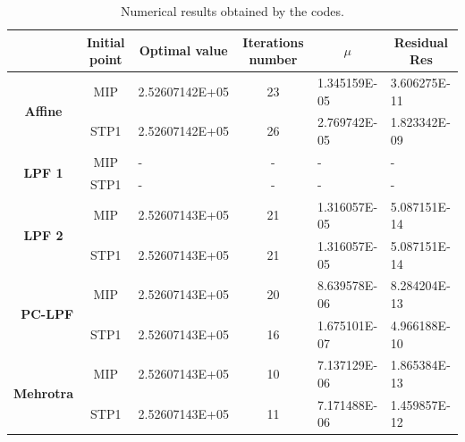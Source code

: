 \documentclass[a4paper,10 pt,titlepage,twoside]{book}
\theoremstyle{plain}
\theoremstyle{definition}
\theoremstyle{remark}
\begin{document}
\begin{table}[]\caption{\label{table:TP}Numerical results obtained by the codes.}
	\begin{tabular}{cclcll}
		\hline		\textbf{} & \textbf{Initial point} & \multicolumn{1}{c}{\textbf{Optimal value}} & \textbf{Iterations number} & \multicolumn{1}{c}{\textbf{$\mu$}} & \multicolumn{1}{c}{\textbf{Residual} Res} \\ \hline
		\multicolumn{1}{c|}{\multirow{2}{*}{\textbf{Affine}}} & MIP & 2.52607142E+05 & 23 & 1.345159E-05 & 3.606275E-11 \\
		\multicolumn{1}{c|}{} & STP1 & 2.52607142E+05 & 26 & 2.769742E-05 & 1.823342E-09 \\ \hline
		\multicolumn{1}{c|}{\multirow{2}{*}{\textbf{LPF 1}}} & MIP & - & - & - & - \\
		\multicolumn{1}{c|}{} & STP1 & - & - & - & - \\ \hline
		\multicolumn{1}{c|}{\multirow{2}{*}{\textbf{LPF 2}}} & MIP & 2.52607143E+05 & 21 & 1.316057E-05 & 5.087151E-14 \\
		\multicolumn{1}{c|}{} & STP1 & 2.52607143E+05 & 21 & 1.316057E-05 & 5.087151E-14 \\ \hline
		\multicolumn{1}{r|}{\multirow{2}{*}{\textbf{PC-LPF}}} & MIP & 2.52607143E+05 & 20 & 8.639578E-06 & 8.284204E-13 \\
		\multicolumn{1}{r|}{} & STP1 & 2.52607143E+05 & 16 & 1.675101E-07 & 4.966188E-10 \\ \hline
		\multicolumn{1}{c|}{\multirow{2}{*}{\textbf{Mehrotra}}} & MIP & 2.52607143E+05 & 10 & 7.137129E-06 & 1.865384E-13 \\
		\multicolumn{1}{c|}{} & STP1 & 2.52607143E+05 & 11 & 7.171488E-06 & 1.459857E-12 \\ \hline
	\end{tabular}
\end{table}
\end{document}

